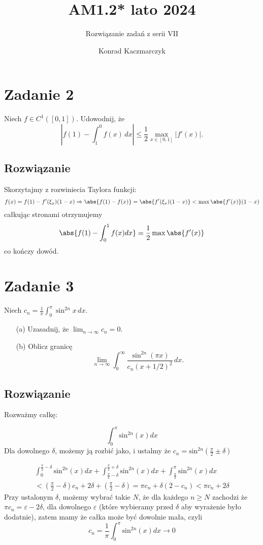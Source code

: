 \documentclass[11pt]{scrartcl}
\author{Konrad Kaczmarczyk}
\begin{document}
  \title{AM1.2* lato 2024}
  \subtitle{Rozwiązanie zadań z serii VII}
  \maketitle

\section*{Zadanie 2}
Niech \(f \in C^1([0, 1])\). Udowodnij, że
\[
\left| f(1) - \int_1^0 f(x) \, dx \right| \leq \frac{1}{2} \max_{x \in [0,1]} |f'(x)|.
\]

\subsection*{Rozwiązanie}

  Skorzytajmy z rozwiniecia Taylora funkcji:
  \[
    f(x) = f(1) - f'(\xi_x) (1-x) \Rightarrow \abs{ f(1) - f(x) }  = \abs{ f'(\xi_x) (1-x) } < \max \abs{f'(x)} (1-x)
  \]
  całkując stronami otrzymujemy
  \[
    \abs{f(1) - \int_0^1 f(x) dx} = \frac{1}{2} \max \abs{f'(x)} 
  \]
  co kończy dowód.

\section*{Zadanie 3}
Niech \(c_n = \frac{1}{\pi} \int_0^{\pi} \sin^{2n} x \, dx\).
\begin{itemize}
    \item[(a)] Uzasadnij, że \(\lim_{n \to \infty} c_n = 0\).
    \item[(b)] Oblicz granicę
    \[
    \lim_{n \to \infty} \int_0^{\infty} \frac{\sin^{2n}(\pi x)}{c_n (x + 1/2)^2} \, dx.
    \]
\end{itemize}

\subsection*{Rozwiązanie}

Rozważmy całkę:

\[
  \int_0^\pi \text{sin}^{2n} \left ( x \right ) dx 
\]
Dla dowolnego $\delta$, możemy ją rozbić jako, i ustalmy że $c_n = \text{sin}^{2n} \left ( \frac{\pi}{2} \pm \delta \right )$

\begin{gather*}
  \int_0^{\frac{\pi}{2} - \delta} \text{sin}^{2n} \left ( x \right ) dx + \int_{\frac{\pi}{2} - \delta}^{\frac{\pi}{2} + \delta} \text{sin}^{2n} \left ( x \right ) dx + \int_{\frac{\pi}{2} }^{\pi} \text{sin}^{2n} \left ( x \right ) dx \\
  < \left ( \frac{\pi}{2} - \delta \right ) c_n + 2 \delta + \left ( \frac{\pi}{2} - \delta \right ) = \pi c_n + \delta (2 - c_n) < \pi c_n + 2 \delta 
\end{gather*}
Przy ustalonym $\delta$, możemy wybrać takie $N$, że dla każdego $n \geq N$ zachodzi że $\pi c_n = \varepsilon - 2 \delta$, dla dowolnego $\varepsilon$ (które wybieramy przed $\delta$ aby wyrażenie było dodatnie), zatem mamy że całka może być dowolnie mała, czyli
\[
  c_n = \frac{1}{\pi} \int_0^\pi \text{sin}^{2n} \left ( x \right ) dx \to 0  
\]
\end{document}
